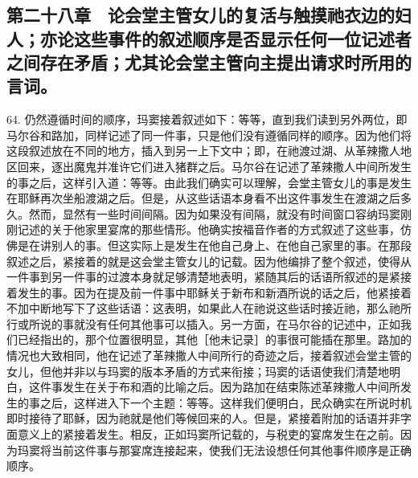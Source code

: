 

\section{}


\subsection{第二十八章　论会堂主管女儿的复活与触摸祂衣边的妇人；亦论这些事件的叙述顺序是否显示任何一位记述者之间存在矛盾；尤其论会堂主管向主提出请求时所用的言词。}

64. 仍然遵循时间的顺序，玛窦接着叙述如下：等等，直到我们读到另外两位，即马尔谷和路加，同样记述了同一件事，只是他们没有遵循同样的顺序。因为他们将这段叙述放在不同的地方，插入到另一上下文中；即，在祂渡过湖、从革辣撒人地区回来，逐出魔鬼并准许它们进入猪群之后。马尔谷在记述了革辣撒人中间所发生的事之后，这样引入道：等等。由此我们确实可以理解，会堂主管女儿的事是发生在耶稣再次坐船渡湖之后。但是，从这些话语本身看不出这件事发生在渡湖之后多久。然而，显然有一些时间间隔。因为如果没有间隔，就没有时间窗口容纳玛窦刚刚记述的关于他家里宴席的那些情形。他确实按福音作者的方式叙述了这些事，仿佛是在讲别人的事。但这实际上是发生在他自己身上、在他自己家里的事。在那段叙述之后，紧接着的就是这会堂主管女儿的记载。因为他编排了整个叙述，使得从一件事到另一件事的过渡本身就足够清楚地表明，紧随其后的话语所叙述的是紧接着发生的事。因为在提及前一件事中耶稣关于新布和新酒所说的话之后，他紧接着不加中断地写下了这些话语：这表明，如果此人在祂说这些话时接近祂，那么祂所行或所说的事就没有任何其他事可以插入。另一方面，在马尔谷的记述中，正如我们已经指出的，那个位置很明显，其他［他未记录］的事很可能插在那里。路加的情况也大致相同，他在记述了革辣撒人中间所行的奇迹之后，接着叙述会堂主管的女儿，但他并非以与玛窦的版本矛盾的方式来衔接；玛窦的话语使我们清楚地明白，这件事发生在关于布和酒的比喻之后。因为路加在结束陈述革辣撒人中间所发生的事之后，这样进入下一个主题：等等。这样我们便明白，民众确实在所说时机即时接待了耶稣，因为祂就是他们等候回来的人。但是，紧接着附加的话语并非字面意义上的紧接着发生。相反，正如玛窦所记载的，与税吏的宴席发生在之前。因为玛窦将当前这件事与那宴席连接起来，使我们无法设想任何其他事件顺序是正确顺序。\par

